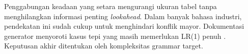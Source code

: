 \documentclass[../main.tex]{subfiles}
\begin{document}
\IfSubfilesClassLoaded{


}{}

Penggabungan keadaan yang setara mengurangi ukuran tabel tanpa menghilangkan informasi penting \emph{lookahead}. Dalam banyak bahasa industri, pendekatan ini sudah cukup untuk menghindari konflik mayor. Dokumentasi generator menyoroti kasus tepi yang masih memerlukan LR(1) penuh \citep{WikiLALR}. Keputusan akhir ditentukan oleh kompleksitas grammar target.

\IfSubfilesClassLoaded{%


}{}
\end{document}
